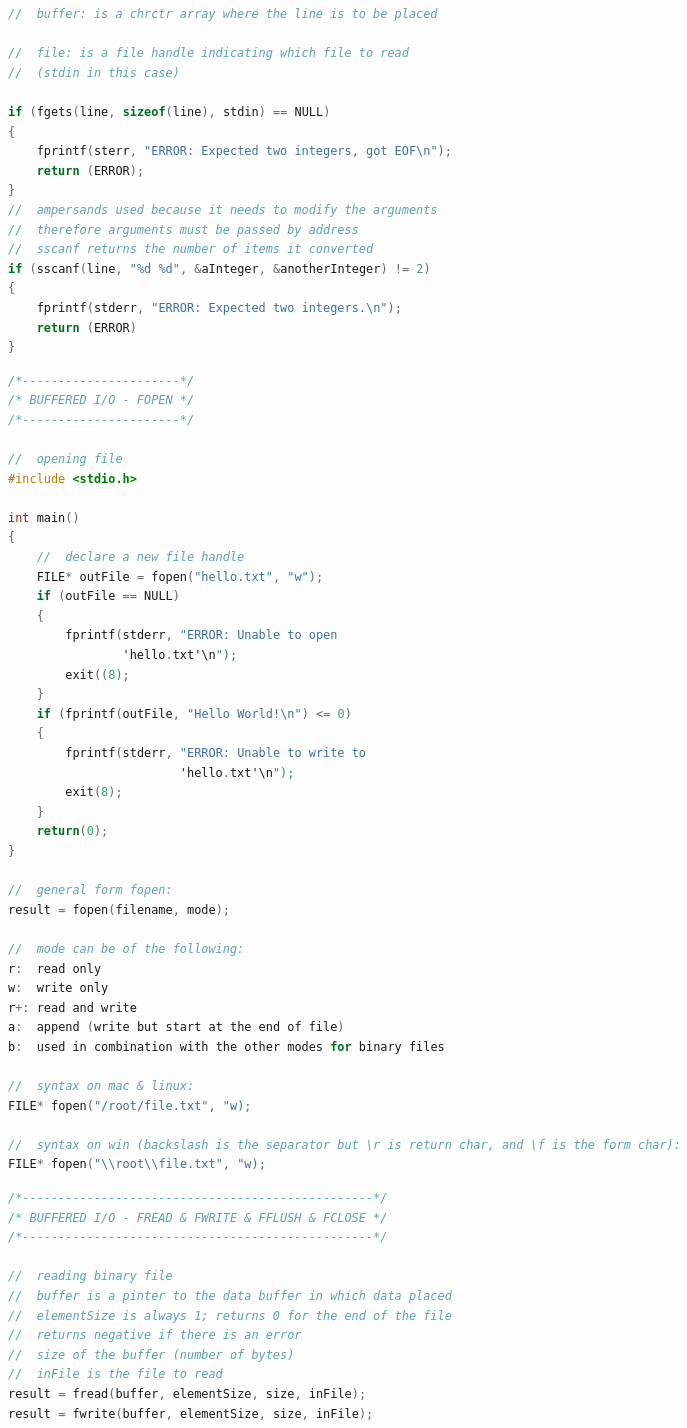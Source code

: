 \documentclass[8pt]{extarticle}
\begin{document}
\begin{small}
\begin{multicols}{2}
\begin{lstlisting}[language=C]
//  buffer: is a chrctr array where the line is to be placed

//  file: is a file handle indicating which file to read
//  (stdin in this case)

if (fgets(line, sizeof(line), stdin) == NULL)
{
	fprintf(sterr, "ERROR: Expected two integers, got EOF\n");
	return (ERROR);
}
//  ampersands used because it needs to modify the arguments 
//  therefore arguments must be passed by address
//  sscanf returns the number of items it converted
if (sscanf(line, "%d %d", &aInteger, &anotherInteger) != 2)
{
	fprintf(stderr, "ERROR: Expected two integers.\n");
	return (ERROR)
}
\end{lstlisting}

\begin{lstlisting}[language=C]
/*----------------------*/
/* BUFFERED I/O - FOPEN */
/*----------------------*/

//  opening file
#include <stdio.h>

int main()
{
	//  declare a new file handle
	FILE* outFile = fopen("hello.txt", "w");
	if (outFile == NULL)
	{
		fprintf(stderr, "ERROR: Unable to open 
				'hello.txt'\n");
		exit((8);
	}
	if (fprintf(outFile, "Hello World!\n") <= 0)
	{
		fprintf(stderr, "ERROR: Unable to write to 
						'hello.txt'\n");
		exit(8);
	}
	return(0);
}

//  general form fopen:
result = fopen(filename, mode);

//  mode can be of the following:
r:	read only
w:	write only
r+:	read and write
a:	append (write but start at the end of file)
b:	used in combination with the other modes for binary files

//  syntax on mac & linux:
FILE* fopen("/root/file.txt", "w);

//  syntax on win (backslash is the separator but \r is return char, and \f is the form char):
FILE* fopen("\\root\\file.txt", "w);
\end{lstlisting}


\begin{lstlisting}[language=C]
/*-------------------------------------------------*/
/* BUFFERED I/O - FREAD & FWRITE & FFLUSH & FCLOSE */
/*-------------------------------------------------*/

//  reading binary file
//  buffer is a pinter to the data buffer in which data placed
//  elementSize is always 1; returns 0 for the end of the file
//  returns negative if there is an error
//  size of the buffer (number of bytes)
//  inFile is the file to read
result = fread(buffer, elementSize, size, inFile);
result = fwrite(buffer, elementSize, size, inFile);


\end{lstlisting}
\end{multicols}
\end{small}
\end{document}
